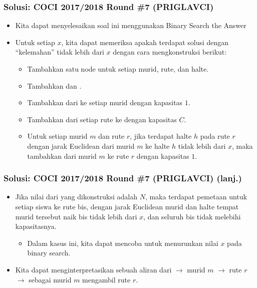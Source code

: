 \begin{frame}
\frametitle{Solusi: COCI 2017/2018 Round \#7 (PRIGLAVCI)}
\begin{itemize}
  \item Kita dapat menyelesaikan soal ini menggunakan Binary Search the Answer
  \item Untuk setiap $x$, kita dapat memeriksa apakah terdapat solusi dengan “kelemahan” tidak lebih dari $x$ dengan cara mengkonstruksi \fgraph berikut:
  \begin{itemize}
    \item Tambahkan satu node untuk setiap murid, rute, dan halte.
    \item Tambahkan \fnode \fsource dan \fsink.
    \item Tambahkan \fedge dari \fsource ke setiap murid dengan kapasitas $1$.
    \item Tambahkan \fedge dari setiap rute ke \fsink dengan kapasitas $C$.
    \item Untuk setiap murid $m$ dan rute $r$, jika terdapat halte $h$ pada rute $r$ dengan jarak Euclidean dari murid $m$ ke halte $h$ tidak lebih dari $x$, maka tambahkan \fedge dari murid $m$ ke rute $r$ dengan kapasitas $1$.
  \end{itemize}
\end{itemize}
\end{frame}

\begin{frame}
\frametitle{Solusi: COCI 2017/2018 Round \#7 (PRIGLAVCI) (lanj.)}
\begin{itemize}
  \item Jika nilai \fmaxflow dari \fgraph yang dikonstruksi adalah $N$, maka terdapat pemetaan untuk setiap siswa ke rute bis, dengan jarak Euclidean murid dan halte tempat murid tersebut naik bis tidak lebih dari $x$, dan seluruh bis tidak melebihi kapasitasnya.
  \begin{itemize}
    \item Dalam kasus ini, kita dapat mencoba untuk menurunkan nilai $x$ pada binary search.
  \end{itemize}
  \item Kita dapat menginterpretasikan sebuah aliran dari \fsource $\rightarrow$ murid $m$ $\rightarrow$ rute $r$ $\rightarrow$ \fsink sebagai murid $m$ mengambil rute $r$.
\end{itemize}
\end{frame}




